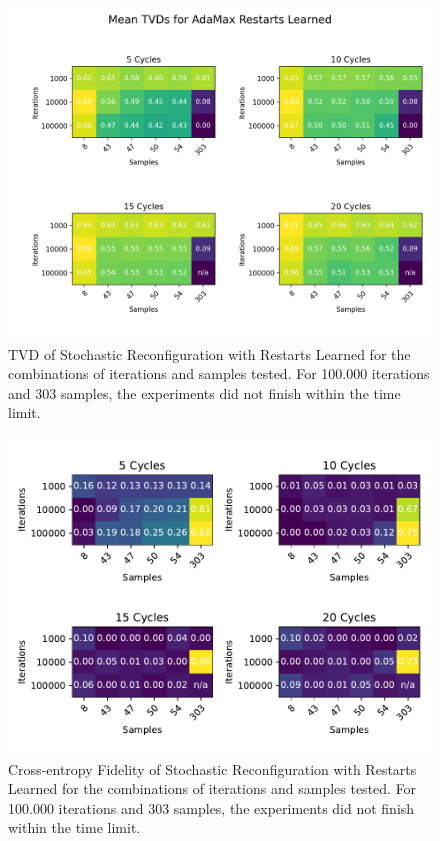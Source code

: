 \begin{figure}[H]
  \centering
  \includegraphics[width=\textwidth]{figures/results/AM-restarts-learned/tvd_heatmap.png}
  \caption[TVD of AdaMax with Restarts Learned]{TVD of Stochastic 
  Reconfiguration with Restarts Learned for the combinations of iterations and samples tested.
  For 100.000 iterations and 303 samples, the experiments did not finish within the time limit.}
  \label{fig:sr_tvd}
\end{figure}

\begin{figure}[H]
  \centering
  \includegraphics[width=\textwidth]{figures/results/AM-restarts-learned/fxeb_heatmap.pdf}
  \caption[Cross-entropy Fidelity of AdaMax with Restarts Learned]{Cross-entropy Fidelity of Stochastic 
  Reconfiguration with Restarts Learned for the combinations of iterations and samples tested.
  For 100.000 iterations and 303 samples, the experiments did not finish within the time limit.}
  \label{fig:sr_tvd}
\end{figure}


